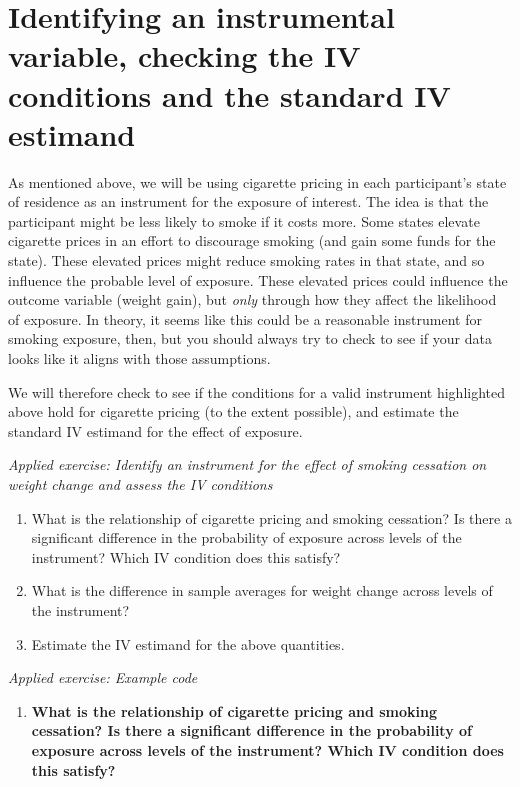 \documentclass[
]{book}
\providecommand{\tightlist}{%
  \setlength{\itemsep}{0pt}\setlength{\parskip}{0pt}}
\begin{document}
\section{Identifying an instrumental variable, checking the IV conditions and the standard IV estimand}\label{identifying-an-instrumental-variable-checking-the-iv-conditions-and-the-standard-iv-estimand}

As mentioned above, we will be using cigarette pricing in each participant's state of residence as an instrument for the exposure of interest. The idea is that the
participant might be less likely to smoke if it costs more. Some states elevate
cigarette prices in an effort to discourage smoking (and gain some funds for the
state). These elevated prices might reduce smoking rates in that state, and so
influence the probable level of exposure. These elevated prices could influence
the outcome variable (weight gain), but \emph{only} through how they affect the
likelihood of exposure. In theory, it seems like this could be a reasonable
instrument for smoking exposure, then, but you should always try to check to
see if your data looks like it aligns with those assumptions.

We will therefore check to see if the conditions for a valid instrument highlighted above hold for cigarette pricing (to the extent possible), and estimate the standard IV estimand for the effect of exposure.

\emph{Applied exercise: Identify an instrument for the effect of smoking cessation on weight change and assess the IV conditions}

\begin{enumerate}
\def\labelenumi{\arabic{enumi}.}
\tightlist
\item
  What is the relationship of cigarette pricing and smoking cessation? Is there a significant difference in the probability of exposure across levels of the instrument? Which IV condition does this satisfy?
\item
  What is the difference in sample averages for weight change across levels of the instrument?
\item
  Estimate the IV estimand for the above quantities.
\end{enumerate}

\emph{Applied exercise: Example code}

\begin{enumerate}
\def\labelenumi{\arabic{enumi}.}
\tightlist
\item
  \textbf{What is the relationship of cigarette pricing and smoking cessation? Is there a significant difference in the probability of exposure across levels of the instrument? Which IV condition does this satisfy?}
\end{enumerate}
\end{document}
